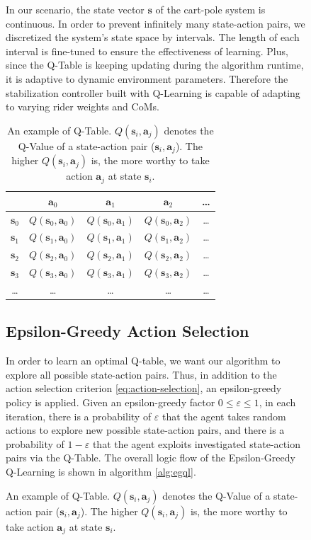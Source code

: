 \documentclass[10pt,a4paper]{article}
\begin{document}
\begin{figure}[H]
	In our scenario, the state vector $\boldsymbol{s}$ of the cart-pole system is continuous. In order to prevent infinitely many state-action pairs, we discretized the system's state space by intervals. The length of each interval is fine-tuned to ensure the effectiveness of learning. Plus, since the Q-Table is keeping updating during the algorithm runtime, it is adaptive to dynamic environment parameters. Therefore the stabilization controller built with Q-Learning is capable of adapting to varying rider weights and CoMs.
	
	\begin{table}
		\centering
		\begin{tabular}{|c|c|c|c|c|}
			\hline
			\diagbox{States}{Actions}& $\boldsymbol{a}_{0}$ & $\boldsymbol{a}_{1}$ & $\boldsymbol{a}_{2}$ & \dots \\
			\hline
			$\boldsymbol{s}_{0}$ & $Q(\boldsymbol{s}_{0}, \boldsymbol{a}_{0})$ & $Q(\boldsymbol{s}_{0}, \boldsymbol{a}_{1})$ & $Q(\boldsymbol{s}_{0}, \boldsymbol{a}_{2})$ & \dots \\
			\hline
			$\boldsymbol{s}_{1}$ & $Q(\boldsymbol{s}_{1}, \boldsymbol{a}_{0})$ & $Q(\boldsymbol{s}_{1}, \boldsymbol{a}_{1})$ & $Q(\boldsymbol{s}_{1}, \boldsymbol{a}_{2})$ & \dots \\
			\hline
			$\boldsymbol{s}_{2}$ &$Q(\boldsymbol{s}_{2}, \boldsymbol{a}_{0})$ & $Q(\boldsymbol{s}_{2}, \boldsymbol{a}_{1})$ & $Q(\boldsymbol{s}_{2}, \boldsymbol{a}_{2})$ & \dots \\
			\hline
			$\boldsymbol{s}_{3}$ & $Q(\boldsymbol{s}_{3}, \boldsymbol{a}_{0})$ & $Q(\boldsymbol{s}_{3}, \boldsymbol{a}_{1})$ & $Q(\boldsymbol{s}_{3}, \boldsymbol{a}_{2})$ & \dots \\
			\hline
			\dots & \dots & \dots & \dots & \dots \\
			\hline
		\end{tabular}
		\caption{An example of Q-Table. $Q(\boldsymbol{s}_{i}, \boldsymbol{a}_{j})$ denotes the Q-Value of a state-action pair ($\boldsymbol{s}_{i}, \boldsymbol{a}_{j}$). The higher $Q(\boldsymbol{s}_{i}, \boldsymbol{a}_{j})$ is, the more worthy to take action $\boldsymbol{a}_{j}$ at state $\boldsymbol{s}_{i}$. } 
		\label{tab:q-table}
	\end{table}
	
	\subsection{Epsilon-Greedy Action Selection}
	In order to learn an optimal Q-table, we want our algorithm to explore all possible state-action pairs. Thus, in addition to the action selection criterion \eqref{eq:action-selection},  an epsilon-greedy policy is applied. Given an epsilon-greedy factor $0 \le \varepsilon \le 1$, in each iteration, there is a probability of $\varepsilon$ that the agent takes random actions to explore new possible state-action pairs, and there is a probability of $1 - \varepsilon$ that the agent exploits investigated state-action pairs via the Q-Table. The overall logic flow of the Epsilon-Greedy Q-Learning is shown in algorithm \ref{alg:egql}. 
	

\end{figure}
\end{document}

